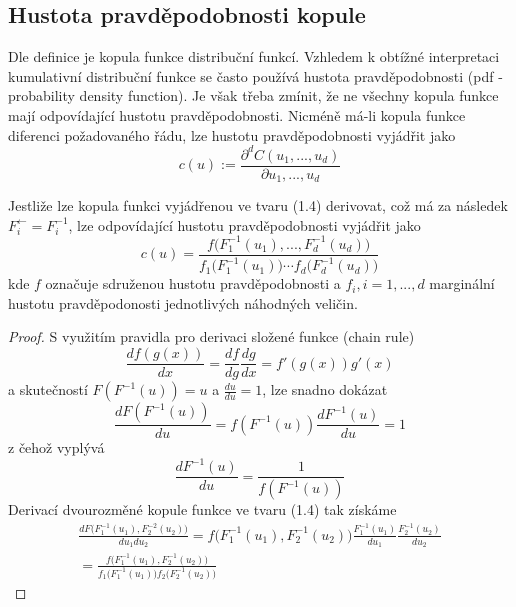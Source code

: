 \subsection{Hustota pravděpodobnosti kopule}

Dle definice je kopula funkce distribuční funkcí. Vzhledem k obtížné interpretaci kumulativní distribuční funkce se často používá hustota pravděpodobnosti (pdf - probability density function). Je však třeba zmínit, že ne všechny kopula funkce mají odpovídající hustotu pravděpodobnosti. Nicméně má-li kopula funkce diferenci požadovaného řádu, lze hustotu pravděpodobnosti vyjádřit jako
\begin{equation*}
c(u) := \frac{\partial^d C(u_1, ..., u_d)}{\partial u_1, ..., u_d}
\end{equation*}

Jestliže lze kopula funkci vyjádřenou ve tvaru (1.4) derivovat, což má za následek $F_i^{\leftarrow} = F_i^{-1}$, lze odpovídající hustotu pravděpodobnosti vyjádřit jako
\begin{equation*}
c(u) = \frac{f\big(F_1^{-1}(u_1), ..., F_d^{-1}(u_d)\big)}{f_1\big(F_1^{-1}(u_1)\big) \cdots f_d\big(F_d^{-1}(u_d)\big)}
\end{equation*}
kde $f$ označuje sdruženou hustotu pravděpodobnosti a $f_i, i = 1, ..., d$ marginální hustotu pravděpodonosti jednotlivých náhodných veličin.
\begin{proof}
S využitím pravidla pro derivaci složené funkce (chain rule)
\begin{equation*}
\frac{d f(g(x))}{dx} = \frac{df}{dg}\frac{dg}{dx} = f'(g(x))g'(x)
\end{equation*}
a skutečností $F(F^{-1}(u)) = u$ a $\frac{du}{du} = 1$, lze snadno dokázat
\begin{equation*}
\frac{dF(F^{-1}(u))}{du} = f(F^{-1}(u))\frac{dF^{-1}(u)}{du} = 1
\end{equation*}
z čehož vyplývá
\begin{equation*}
\frac{dF^{-1}(u)}{du} = \frac{1}{f(F^{-1}(u))}
\end{equation*}
Derivací dvourozměné kopule funkce ve tvaru (1.4) tak získáme
\begin{multline*}
\frac{dF\big(F_1^{-1}(u_1),F_2^{-2}(u_2)\big)}{du_1du_2} = f\big(F_1^{-1}(u_1), F_2^{-1}(u_2)\big)\frac{F_1^{-1}(u_1)}{du_1}\frac{F_2^{-1}(u_2)}{du_2}\\
= \frac{f\big(F_1^{-1}(u_1), F_2^{-1}(u_2)\big)}{f_1\big(F_1^{-1}(u_1)\big)f_2\big(F_2^{-1}(u_2)\big)}
\end{multline*}
\end{proof}

